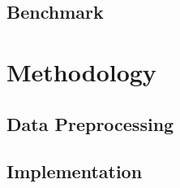 \documentclass[a4paper,10pt]{article}
\begin{document}
\subsection{Benchmark}

\section{Methodology}

\subsection{Data Preprocessing}

\subsection{Implementation}
\end{document}
